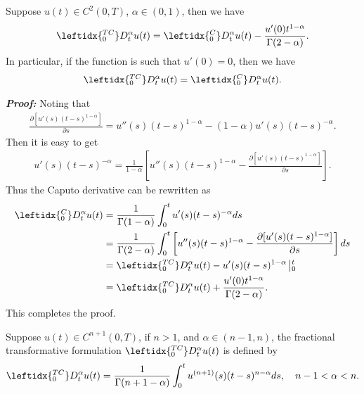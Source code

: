 \documentclass[3p,times]{elsarticle}
\begin{document}
\begin{lem}\label{le1}
Suppose $u(t)\in C^2(0,T)$, $\alpha\in(0,1)$, then we have
\begin{equation*}
\aligned
\leftidx{_0^{TC}}D_t^\alpha u(t)=\leftidx{_0^{C}}D_t^\alpha u(t)-\frac{u'(0)t^{1-\alpha}}{\Gamma(2-\alpha)}.
\endaligned
\end{equation*}
In particular, if the function is such that $u'(0)=0$, then we have
\begin{equation*}
\aligned
\leftidx{_0^{TC}}D_t^\alpha u(t)=\leftidx{_0^{C}}D_t^\alpha u(t).
\endaligned
\end{equation*}
\end{lem}
\textbf{\emph{Proof:}} Noting that
\begin{align*}
\frac{\partial[u'(s)(t-s)^{1-\alpha}]}{\partial s}=u''(s)(t-s)^{1-\alpha}-(1-\alpha)u'(s)(t-s)^{-\alpha}.
\end{align*}
Then it is easy to get
\begin{align*}
u'(s)(t-s)^{-\alpha}=\frac{1}{1-\alpha}\left[u''(s)(t-s)^{1-\alpha}-\frac{\partial[u'(s)(t-s)^{1-\alpha}]}{\partial s}\right].
\end{align*}
Thus the Caputo derivative can be rewritten as
\begin{equation*}
\aligned
\leftidx{_0^{C}}D_t^\alpha u(t)
&=\frac{1}{\Gamma(1-\alpha)}\int_0^tu'(s)(t-s)^{-\alpha}ds\\
&=\frac{1}{\Gamma(2-\alpha)}\int_0^t\left[u''(s)(t-s)^{1-\alpha}-\frac{\partial[u'(s)(t-s)^{1-\alpha}]}{\partial s}\right]ds\\
&=\leftidx{_0^{TC}}D_t^\alpha u(t)-u'(s)(t-s)^{1-\alpha}\left|_0^t\right.\\
&=\leftidx{_0^{TC}}D_t^\alpha u(t)+\frac{u'(0)t^{1-\alpha}}{\Gamma(2-\alpha)}.
\endaligned
\end{equation*}
This completes the proof.

\begin{defn}\label{def2}
Suppose $u(t)\in C^{n+1}(0,T)$, if $n>1$, and $\alpha\in(n-1,n)$, the fractional transformative formulation $\leftidx{_0^{TC}}D_t^\alpha u(t)$ is defined by
\begin{equation*}
\leftidx{_0^{TC}}D_t^\alpha u(t)=\frac{1}{\Gamma(n+1-\alpha)}\int_0^tu^{(n+1)}(s)(t-s)^{n-\alpha}ds,\quad n-1<\alpha<n.
\end{equation*}
\end{defn}
\end{document}
